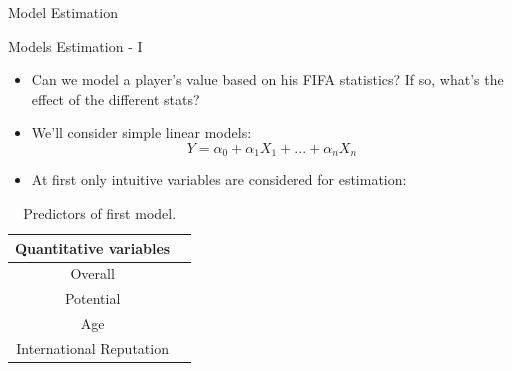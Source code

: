 \documentclass[aspectratio=169,xcolor=dvipsnames]{beamer}
\begin{document}

\begin{frame}{}
    \centering
    \begin{Huge}
    Model Estimation
    \end{Huge}
\end{frame}


\begin{frame}{Models Estimation - I}
\begin{itemize}
\item Can we model a player's value based on his FIFA statistics? If so, what's the effect of the different stats?

\item We'll consider simple linear models:
\begin{equation*}
Y = \alpha_0 + \alpha_1X_1 + ... + \alpha_nX_n
\end{equation*}

\item At first only intuitive variables are considered for estimation:
\end{itemize}

\begin{table}[ht]
\centering
\begin{tabular}{cc}
  \hline
  Quantitative variables \\ 
  \hline
    Overall \\ 
    Potential \\ 
    Age \\
    International Reputation \\
   \hline
\end{tabular}
\caption{Predictors of first model.}
\end{table}
\end{frame}

\end{document}
